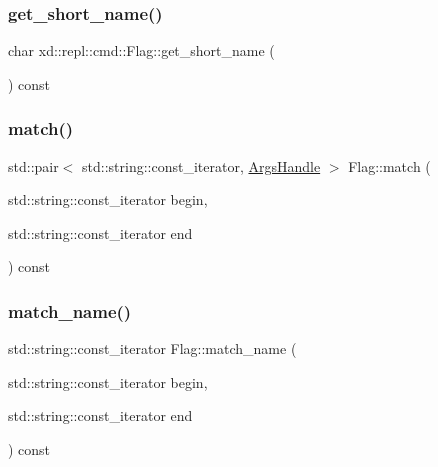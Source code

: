 \mbox{\label{classxd_1_1repl_1_1cmd_1_1_flag_a190fcddf2a374189f9b5744bf8eafc99}} 
\subsubsection{\texorpdfstring{get\+\_\+short\+\_\+name()}{get\_short\_name()}}
{\footnotesize\ttfamily char xd\+::repl\+::cmd\+::\+Flag\+::get\+\_\+short\+\_\+name (\begin{DoxyParamCaption}{ }\end{DoxyParamCaption}) const\hspace{0.3cm}{\ttfamily [inline]}}

\mbox{\label{classxd_1_1repl_1_1cmd_1_1_flag_a3aef57357e84b70762e90e59285c55ae}} 
\subsubsection{\texorpdfstring{match()}{match()}}
{\footnotesize\ttfamily std\+::pair$<$ std\+::string\+::const\+\_\+iterator, \mbox{\hyperlink{classxd_1_1repl_1_1cmd_1_1_args_handle}{Args\+Handle}} $>$ Flag\+::match (\begin{DoxyParamCaption}\item[{std\+::string\+::const\+\_\+iterator}]{begin,  }\item[{std\+::string\+::const\+\_\+iterator}]{end }\end{DoxyParamCaption}) const}

\mbox{\label{classxd_1_1repl_1_1cmd_1_1_flag_a094be89588d4e0b307ddd13169d22772}} 
\subsubsection{\texorpdfstring{match\+\_\+name()}{match\_name()}}
{\footnotesize\ttfamily std\+::string\+::const\+\_\+iterator Flag\+::match\+\_\+name (\begin{DoxyParamCaption}\item[{std\+::string\+::const\+\_\+iterator}]{begin,  }\item[{std\+::string\+::const\+\_\+iterator}]{end }\end{DoxyParamCaption}) const}

